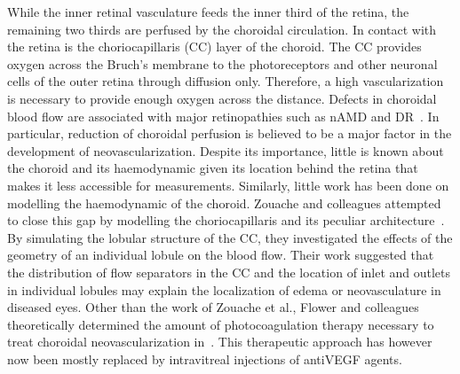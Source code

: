 \documentclass[12pt,a4paper]{journal}
\begin{document}
While the inner retinal vasculature feeds the inner third of the retina, the remaining two thirds are perfused by the choroidal circulation.
In contact with the retina is the choriocapillaris (CC) layer of the choroid.
The CC provides oxygen across the Bruch's membrane to the photoreceptors and other neuronal cells of the outer retina through diffusion only.
Therefore, a high vascularization is necessary to provide enough oxygen across the distance.
Defects in choroidal blood flow are associated with major retinopathies such as nAMD and DR~\cite{Pemp_2008}.
In particular, reduction of choroidal perfusion is believed to be a major factor in the development of neovascularization.
Despite its importance, little is known about the choroid and its haemodynamic given its location behind the retina that makes it less accessible for measurements. 
Similarly, little work has been done on modelling the haemodynamic of the choroid.
Zouache and colleagues attempted to close this gap by modelling the choriocapillaris and its peculiar architecture~\cite{Zouache_2015}.
By simulating the lobular structure of the CC, they investigated the effects of the geometry of an individual lobule on the blood flow.
Their work suggested that the distribution of flow separators in the CC and the location of inlet and outlets in individual lobules may explain the localization of edema or neovasculature in diseased eyes.
Other than the work of Zouache et al., Flower and colleagues theoretically determined the amount of photocoagulation therapy necessary to treat choroidal neovascularization in~\cite{Flower_2001}.
This therapeutic approach has however now been mostly replaced by intravitreal injections of antiVEGF agents.



\end{document}
